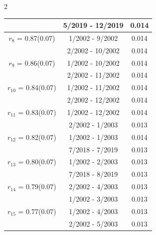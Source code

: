 \begin{multicols}{2}
{\begin{tabular}{ccc}
&        5/2019 - 12/2019 &        0.014  \vspace{-.02in} \\ \hline 
  $r_{ 8}$ = 0.87(0.07) &       1/2002 -  9/2002 &        0.014   \vspace{-.10in} \\  
&        2/2002 - 10/2002 &        0.014  \vspace{-.02in} \\ \hline 
  $r_{ 9}$ = 0.86(0.07) &       1/2002 - 10/2002 &        0.014   \vspace{-.10in} \\  
&        2/2002 - 11/2002 &        0.014  \vspace{-.02in} \\ \hline 
  $r_{10}$ = 0.84(0.07) &       1/2002 - 11/2002 &        0.014   \vspace{-.10in} \\  
&        2/2002 - 12/2002 &        0.014  \vspace{-.02in} \\ \hline 
  $r_{11}$ = 0.83(0.07) &       1/2002 - 12/2002 &        0.014   \vspace{-.10in} \\  
&        2/2002 -  1/2003 &        0.013  \vspace{-.02in} \\ \hline 
  $r_{12}$ = 0.82(0.07) &       1/2002 -  1/2003 &        0.014   \vspace{-.10in} \\  
&        7/2018 -  7/2019 &        0.013  \vspace{-.02in} \\ \hline 
  $r_{13}$ = 0.80(0.07) &       1/2002 -  2/2003 &        0.013   \vspace{-.10in} \\  
&        7/2018 -  8/2019 &        0.013  \vspace{-.02in} \\ \hline 
  $r_{14}$ = 0.79(0.07) &       2/2002 -  4/2003 &        0.013   \vspace{-.10in} \\  
&        1/2002 -  3/2003 &        0.013  \vspace{-.02in} \\ \hline 
  $r_{15}$ = 0.77(0.07) &       1/2002 -  4/2003 &        0.013   \vspace{-.10in} \\  
&        2/2002 -  5/2003 &        0.013  \vspace{-.02in} \\ \hline 

\end{tabular}}
\end{multicols}
